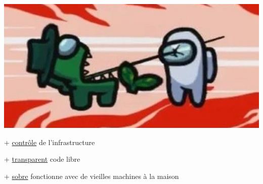 \documentclass[aspectratio=169]{beamer}
\begin{document}
\begin{frame}[t]
\begin{columns}[t]
\begin{column}{0.5\textwidth}
	\begin{center}
		\includegraphics[scale=1]{img/death.jpg}
	\end{center}
	
	\vspace{0.4cm}
	
	+ \underline{contrôle} de l'infrastructure
	
	+ \underline{transparent} code libre 
	
	+ \underline{sobre} fonctionne avec de vieilles machines à la maison
	\end{column}
	\end{columns}

\end{frame}


\graphicspath{{img/}}
\end{document}
